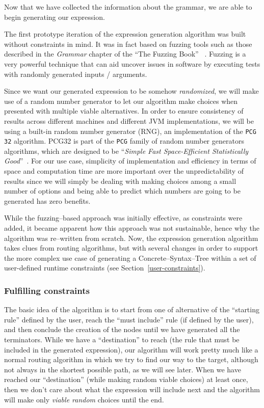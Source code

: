 \documentclass[]{usiinfbachelorproject}
\begin{document}
Now that we have collected the information about the grammar, we are able to
begin generating our expression. 

The first prototype iteration of the expression generation algorithm was built
without constraints in mind. It was in fact based on fuzzing tools such as
those described in the \textit{Grammar} chapter of the ``The Fuzzing Book''
~\cite{fuzzingbook2019Grammars}. Fuzzing is a very powerful technique that can
aid uncover issues in software by executing tests with randomly generated
inputs / arguments.

Since we want our generated expression to be somehow \textit{randomized}, we
will make use of a random number generator to let our algorithm make choices
when presented with multiple viable alternatives.
In order to ensure consistency of results across different machines and
different JVM implementations, we will be using a built-in random number
generator (RNG), an implementation of the \texttt{PCG 32} algorithm.
PCG32 is part of the \texttt{PCG} family of random number generators algorithms,
which are designed to be ``\textit{Simple Fast Space-Efficient Statistically
Good}''~\cite{oneillpcg2014}. For our use case, simplicity of implementation
and efficiency in terms of space and computation time are more important over
the unpredictability of results since we will simply be dealing with making
choices among a small number of options and being able to predict which numbers
are going to be generated has zero benefits.

While the fuzzing–based approach was initially effective, as constraints were
added, it became apparent how this approach was not sustainable, hence why the
algorithm was re–written from scratch. Now, the expression generation algorithm
takes clues from routing algorithms, but with several changes in order to
support the more complex use case of generating a Concrete–Syntax–Tree within a
set of user-defined runtime constraints (see Section~\ref{user-constraints}).

\subsubsection*{\textbf{Fulfilling constraints}}


The basic idea of the algorithm is to start from one of alternative of the
``starting rule'' defined by the user, reach the ``must include'' rule
(if defined by the user), and then conclude the creation of the nodes until we
have generated all the terminators.
While we have a ``destination'' to reach (the rule that must be included in the
generated expression), our algorithm will work pretty much like a normal routing
algorithm in which we try to find our way to the target, although not always
in the shortest possible path, as we will see later. When we have reached
our ``destination'' (while making random viable choices) at least once, then
we don't care about what the expression will include next and the algorithm
will make only \textit{viable random} choices until the end.
\end{document}
